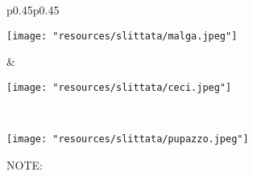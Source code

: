 \documentclass{article}
\begin{document}
\vspace*{2cm}

\begin{table}[h!]
    \centering
    \begin{tabular}{p{0.45\textwidth}p{0.45\textwidth}}
        \begin{minipage}{\linewidth}
            \centering
            \texttt{[image: "resources/slittata/malga.jpeg"]}
        \end{minipage} &
        \begin{minipage}{\linewidth}
            \centering
            \texttt{[image: "resources/slittata/ceci.jpeg"]}
        \end{minipage} \\
        \begin{minipage}{\linewidth}
            \centering
            \texttt{[image: "resources/slittata/pupazzo.jpeg"]}
        \end{minipage}
    \end{tabular}
\end{table}

\newpage

NOTE: 
\end{document}
